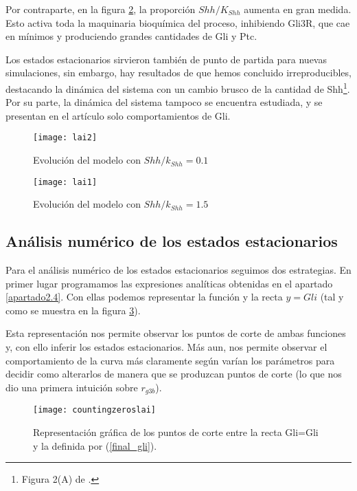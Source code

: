 Por contraparte, en la figura \ref{lai2}, la proporción $Shh/K_{Shh}$ aumenta en gran medida. Esto activa toda la maquinaria bioquímica del proceso, inhibiendo Gli3R, que cae en mínimos y produciendo grandes cantidades de Gli y Ptc.

Los estados estacionarios sirvieron también de punto de partida para nuevas simulaciones, sin embargo, hay resultados de \cite{schaffer} que hemos concluido irreproducibles, destacando la dinámica del sistema con un cambio brusco de la cantidad de Shh\footnote{Figura 2(A) de \cite{schaffer}.}. Por su parte, la dinámica del sistema tampoco se encuentra estudiada, y se presentan en el artículo solo comportamientos de Gli.



 \begin{figure}[h]
 	\texttt{[image: lai2]}
 	\centering
 	\caption{Evolución del modelo \cite{schaffer} con $Shh/k_{Shh}=0.1$ }
 	\label{lai1}
 \end{figure}


\begin{figure}[h]
	\texttt{[image: lai1]}
	\centering
	\caption{Evolución del modelo \cite{schaffer} con $Shh/k_{Shh}=1.5$}
	\label{lai2}
\end{figure}

\subsection{Análisis numérico de los estados estacionarios}

Para el análisis numérico de los estados estacionarios seguimos dos estrategias. 
En primer lugar programamos las expresiones analíticas obtenidas en el apartado \ref{apartado2.4}. Con ellas podemos representar la función y la recta $y=Gli$ (tal y como se muestra en la figura \ref{lai_123}). 

Esta representación nos permite observar los puntos de corte de ambas funciones y, con ello inferir los estados estacionarios. Más aun, nos permite observar el comportamiento de la curva más claramente según varían los parámetros para decidir como alterarlos de manera que se produzcan puntos de corte (lo que nos dio una primera intuición sobre $r_{g3b}$).

\begin{figure}[h]
	\texttt{[image: countingzeroslai]}
	\centering
	\caption{Representación gráfica de los puntos de corte entre la recta Gli=Gli y la definida por (\ref{final_gli}).}
	\label{lai_123}
\end{figure}

